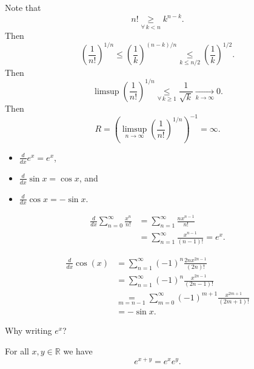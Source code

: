 \documentclass{notes}
\begin{document}
  \begin{prf}
    Note that 
    \[
      n! \underset{\forall \, k < n}{\geq} k^{n - k}.
    \]
    Then 
    \[
      \left ( \frac{1}{n!} \right )^{1 / n} \leq \left ( \frac{1}{k} \right )^{(n - k) / n} \underset{k \leq n / 2}{\leq} \left ( \frac{1}{k} \right )^{1 / 2}.
    \]
    Then 
    \[
      \limsup \left ( \frac{1}{n!} \right )^{1 / n} \underset{\forall \, k \geq 1}{\leq} \frac{1}{\sqrt k} \underset{k \to \infty}{\longrightarrow} 0.
    \]
    Then 
    \[
      R = \left ( \limsup_{n \to \infty} \left ( \frac{1}{n!} \right )^{1 / n} \right )^{-1} = \infty.
    \]
  \end{prf}
  
  \begin{lem}
    \begin{itemize}
      \item $\frac{d}{dx} e^x = e^x$, 
        
      \item $\frac{d}{dx} \sin x = \cos x$, and 

      \item $\frac{d}{dx} \cos x = -\sin x$.
    \end{itemize}
  \end{lem}
  
  \begin{prf}
    \begin{align*}
      \frac{d}{dx} \sum_{n = 0}^\infty \frac{x^n}{n!} &= \sum_{n = 1}^\infty \frac{n x^{n - 1}}{n!} \\ 
      &= \sum_{n = 1}^\infty \frac{x^{n - 1}}{(n - 1)!} = e^x.
    \end{align*}
    
    \begin{align*}
      \frac{d}{dx} \cos(x) &= \sum_{n = 1}^\infty (-1)^n \frac{2 n x^{2 n - 1}}{(2 n)!} \\ 
      &= \sum_{n = 1}^\infty (-1)^n \frac{x^{2 n - 1}}{(2 n - 1)!} \\ 
      &\underset{m = n - 1}{=} \sum_{m = 0}^\infty (-1)^{m + 1} \frac{x^{2 m + 1}}{(2 m + 1)!} \\ 
      &= -\sin x.
    \end{align*}
  \end{prf}
  
  Why writing $e^x$?

  \begin{lem}
    For all $x, y \in \mathbb R$ we have 
    \[
      e^{x + y} = e^x e^y.
    \]
  \end{lem}
  
\end{document}
